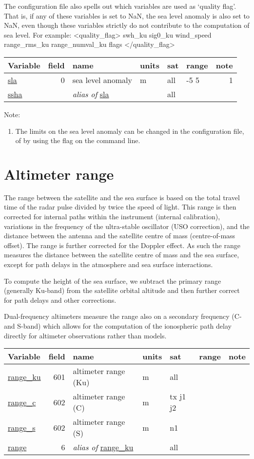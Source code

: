 \documentclass[a4paper,11pt,openany,natbib]{thesis}
\makeatletter
\newcommand\var[1]{\url{#1}\index{variables!#1@\protect\url{#1}}}
\newcommand\alias[1]{\emph{alias of} \var{#1}}
\newenvironment{vartable}{
\begin{table}[ht]
\small
\begin{tabular}{lrllllr}
\hline
Variable & field & name & units & sat & range & note \\
\hline
}{
\hline
\end{tabular}
\end{table}
}
\newenvironment{smallverb}{\small\verbatim}{\endverbatim}
\makeatother
\begin{document}
The configuration file also spells out which variables are used as `quality flag'. That is, if any of these variables is set to NaN, the sea level anomaly is also set to NaN, even though these variables strictly do not contribute to the computation of sea level. For example:
\begin{smallverb}
<quality_flag>
    swh_ku sig0_ku wind_speed range_rms_ku range_numval_ku flags
</quality_flag>
\end{smallverb} 
\begin{vartable}
\var{sla} & 0 & sea level anomaly & m & all & -5 5 & 1 \\
\hline
\var{ssha} & & \alias{sla} & & all & & \\
\end{vartable}

Note:
\begin{enumerate}
\item The limits on the sea level anomaly can be changed in the configuration file, of by using the  flag on the command line.
\end{enumerate}

\section{Altimeter range}
\label{var:range}
The range between the satellite and the sea surface is based on the total travel time of the radar pulse divided by twice the speed of light. This range is then corrected for internal paths within the instrument (internal calibration), variations in the frequency of the ultra-stable oscillator (USO correction), and the distance between the antenna and the satellite centre of mass (centre-of-mass offset). The range is further corrected for the Doppler effect. As such the range measures the distance between the satellite centre of mass and the sea surface, except for path delays in the atmosphere and sea surface interactions.

To compute the height of the sea surface, we subtract the primary range (generally Ku-band) from the satellite orbital altitude and then further correct for path delays and other corrections.

Dual-frequency altimeters measure the range also on a secondary frequency (C- and S-band) which allows for the computation of the ionospheric path delay directly for altimeter observations rather than models.

\begin{vartable}
\var{range_ku} & 601 & altimeter range (Ku) & m & all & & \\
\var{range_c}  & 602 & altimeter range (C) & m & tx j1 j2 & & \\
\var{range_s}  & 602 & altimeter range (S) & m & n1 & & \\
\hline
\var{range} & 6 & \alias{range_ku} & & all & & \\
\end{vartable}
\end{document}

